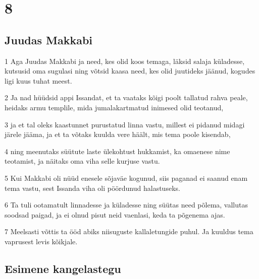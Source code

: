 \chapter{8}


\section*{Juudas Makkabi}

\par 1 Aga Juudas Makkabi ja need, kes olid koos temaga, läksid salaja küladesse, kutsusid oma sugulasi ning võtsid kaasa need, kes olid juutideks jäänud, kogudes ligi kuus tuhat meest.
\par 2 Ja nad hüüdsid appi Issandat, et ta vaataks kõigi poolt tallatud rahva peale, heidaks armu templile, mida jumalakartmatud inimesed olid teotanud,
\par 3 ja et tal oleks kaastunnet purustatud linna vastu, millest ei pidanud midagi järele jääma, ja et ta võtaks kuulda vere häält, mis tema poole kisendab,
\par 4 ning meenutaks süütute laste ülekohtust hukkamist, ka omaenese nime teotamist, ja näitaks oma viha selle kurjuse vastu.
\par 5 Kui Makkabi oli nüüd enesele sõjaväe kogunud, siis paganad ei saanud enam tema vastu, sest Issanda viha oli pöördunud halastuseks.
\par 6 Ta tuli ootamatult linnadesse ja küladesse ning süütas need põlema, vallutas soodsad paigad, ja ei olnud pisut neid vaenlasi, keda ta põgenema ajas.
\par 7 Meelsasti võttis ta ööd abiks niisuguste kallaletungide puhul. Ja kuuldus tema vaprusest levis kõikjale.


\section*{Esimene kangelastegu}

